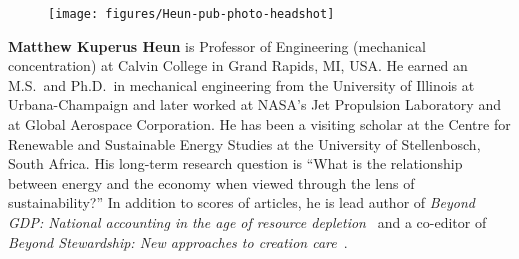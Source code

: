 \setlength{\intextsep}{-7pt}%
\setlength{\columnsep}{8pt}%
\begin{figure}
  \begin{center}
    \texttt{[image: figures/Heun-pub-photo-headshot]}
  \end{center}
\end{figure}
\textbf{Matthew Kuperus Heun} is Professor of Engineering 
(mechanical concentration)
at Calvin College in Grand Rapids, MI, USA.
He earned an M.S.\ and Ph.D.\ in mechanical engineering from 
the University of Illinois at Urbana-Champaign and 
later worked at NASA's Jet Propulsion Laboratory and at Global Aerospace Corporation. 
He has been a visiting scholar at the Centre for Renewable and Sustainable Energy Studies 
at the University of Stellenbosch, South Africa. 
His long-term research question is 
``What is the relationship between energy and the economy when viewed through the lens of sustainability?''
In addition to scores of articles, he is lead author of 
\emph{Beyond GDP: National accounting in the age of resource depletion}~\citep{Heun:2015aa} 
and a co-editor of
\emph{Beyond Stewardship: New approaches to creation care}~\citep{Warners:2019aa}.
